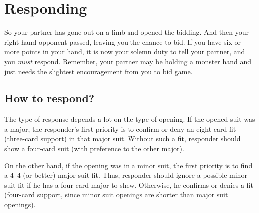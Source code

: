 \documentclass[oneside]{memoir}
\begin{document}
\section{Responding}

So your partner has gone out on a limb and opened the bidding.  And then
your right hand opponent passed, leaving you the chance to bid.  If you
have six or more points in your hand, it is now your solemn duty to tell
your partner, and you \textit{must} respond.  Remember, your partner may
be holding a monster hand and just needs the slightest encouragement from
you to bid game.

\subsection{How to respond?}
The type of response depends a lot on the type of opening.  If the opened
suit was a major, the responder's first priority is to confirm or deny an
eight-card fit (three-card support) in that major suit.  Without such a 
fit, responder should show a four-card suit (with preference to the other
major).

On the other hand, if the opening was in a minor suit, the first priority
is to find a 4--4 (or better) major suit fit.  Thus, responder should ignore
a possible minor suit fit if he has a four-card major to show.  Otherwise,
he confirms or denies a fit (four-card support, since minor suit openings
are shorter than major suit openings).

\end{document}
